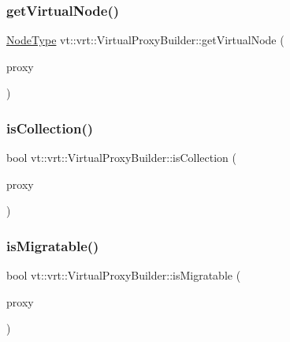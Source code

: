 \subsubsection{\texorpdfstring{get\+Virtual\+Node()}{getVirtualNode()}}
{\footnotesize\ttfamily \hyperlink{namespacevt_a866da9d0efc19c0a1ce79e9e492f47e2}{Node\+Type} vt\+::vrt\+::\+Virtual\+Proxy\+Builder\+::get\+Virtual\+Node (\begin{DoxyParamCaption}\item[{\hyperlink{namespacevt_a1b417dd5d684f045bb58a0ede70045ac}{Virtual\+Proxy\+Type} const \&}]{proxy }\end{DoxyParamCaption})\hspace{0.3cm}{\ttfamily [static]}}

\mbox{\label{structvt_1_1vrt_1_1_virtual_proxy_builder_a87543511e2cbf4af1fc98ebf1b12161f}} 
\subsubsection{\texorpdfstring{is\+Collection()}{isCollection()}}
{\footnotesize\ttfamily bool vt\+::vrt\+::\+Virtual\+Proxy\+Builder\+::is\+Collection (\begin{DoxyParamCaption}\item[{\hyperlink{namespacevt_a1b417dd5d684f045bb58a0ede70045ac}{Virtual\+Proxy\+Type} const \&}]{proxy }\end{DoxyParamCaption})\hspace{0.3cm}{\ttfamily [static]}}

\mbox{\label{structvt_1_1vrt_1_1_virtual_proxy_builder_ab402290d7e593c587a650b9dd1d369cc}} 
\subsubsection{\texorpdfstring{is\+Migratable()}{isMigratable()}}
{\footnotesize\ttfamily bool vt\+::vrt\+::\+Virtual\+Proxy\+Builder\+::is\+Migratable (\begin{DoxyParamCaption}\item[{\hyperlink{namespacevt_a1b417dd5d684f045bb58a0ede70045ac}{Virtual\+Proxy\+Type} const \&}]{proxy }\end{DoxyParamCaption})\hspace{0.3cm}{\ttfamily [static]}}

